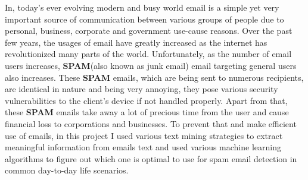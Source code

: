 In, today's ever evolving modern and busy world email is a simple yet very important source
of communication between various groups of people due to personal, business, corporate
and government use-cause reasons.
Over the past few years, the usages of email have greatly increased as
the internet has revolutionized many parts of the world.
Unfortunately, as the number of email users increases, \textbf{SPAM}(also known as junk email)
email targeting general users also increases.
These \textbf{SPAM} emails, which are being sent to numerous recipients, are identical in
nature and being very annoying, they pose various security vulnerabilities to the
client's device if not handled properly.
Apart from that, these \textbf{SPAM} emails take away a lot of precious time from the user
and cause financial loss to corporations and businesses.
To prevent that and make efficient use of emails, in this project I
used various text mining strategies to extract meaningful information from
emails text and used various machine learning algorithms to figure out which one is optimal to
use for spam email detection in common day-to-day life scenarios.